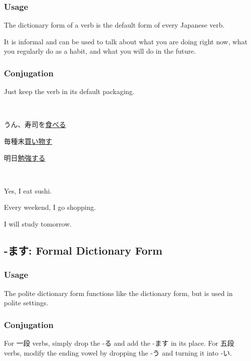 \documentclass{article}
\begin{document}
\begin{CJK}{UTF8}{min}
\subsubsection{Usage}

The dictionary form of a verb is the default form of every Japanese verb. 

It is informal and can be used to talk about what you are doing right now, what you regularly do as a habit, and what you will do in the future.

\subsubsection{Conjugation}

Just keep the verb in its default packaging.

\begin{example}
    \ 

うん、寿司を\underline{食べる}

毎種末\underline{買い物す}

明日\underline{勉強する}
\end{example}
\begin{solution}
    \ 

Yes, I eat sushi.

Every weekend, I go shopping.

I will study tomorrow.
\end{solution}

\subsection{-ます: Formal Dictionary Form}

\subsubsection{Usage}

The polite dictionary form functions like the dictionary form, but is used in polite settings.

\subsubsection{Conjugation}

For 一段 verbs, simply drop the -る and add the -ます in its place. For 五段 verbs, modify the ending vowel by dropping the -う and turning it into -い.

\begin{example}
\ 


\end{example}
\end{CJK}
\end{document}
